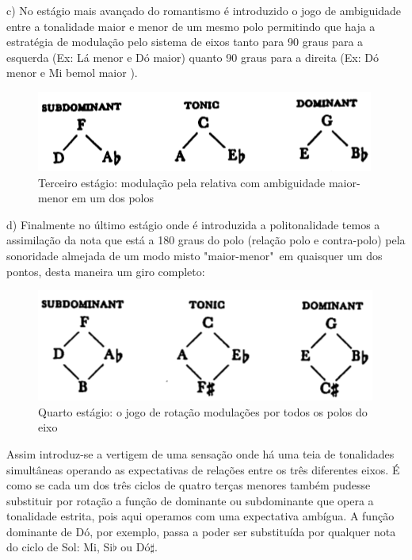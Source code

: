 \documentclass[
	12pt,				%
	openright,			%
	twoside,			%
	a4paper,			%
	english,			%
	french,				%
	spanish,			%
	brazil				%
	]{abntex2}
\begin{document}
c) No estágio mais avançado do romantismo é introduzido o jogo de ambiguidade entre a tonalidade maior e menor de um mesmo polo permitindo que haja a estratégia de modulação pelo sistema de eixos tanto para 90 graus para a esquerda (Ex: Lá menor e Dó maior) quanto 90 graus para a direita (Ex: Dó menor e Mi bemol maior ).

\begin{figure}[!h]
	\caption{\label{fig_grafico}Terceiro estágio: modulação pela relativa com ambiguidade maior-menor em um dos polos }
	\begin{center}
	    \includegraphics[scale=0.5]{axis/estagio03.png}
	\end{center}
\end{figure}


d) Finalmente no último estágio onde é introduzida a politonalidade temos a assimilação da nota que está a 180 graus do polo (relação polo e contra-polo) pela sonoridade almejada de um modo misto "maior-menor"\ em quaisquer um dos pontos, desta maneira um giro completo:


\begin{figure}[!h]
	\caption{\label{fig_grafico}Quarto estágio: o jogo de rotação modulações por todos os polos do eixo }
	\begin{center}
	    \includegraphics[scale=0.5]{axis/estagio04.png}
	\end{center}
\end{figure}


Assim introduz-se a vertigem de uma sensação onde há uma teia de tonalidades simultâneas operando as expectativas de relações entre os três diferentes eixos. É como se cada um dos três ciclos de quatro terças menores também pudesse substituir por rotação a função de dominante ou subdominante que opera a tonalidade estrita, pois aqui operamos com uma expectativa ambígua. A função dominante de Dó, por exemplo, passa a poder ser substituída por qualquer nota do ciclo de Sol: Mi, Si$\flat$ ou Dó$\sharp$.
\end{document}
